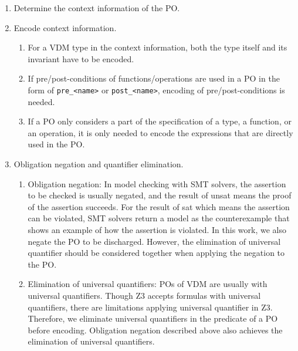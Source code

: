 \begin{enumerate}
\item
Determine the context information of the PO.
\item
Encode context information.
\begin{enumerate}
\item
For a VDM type in the context information, both the type itself and its invariant have to be encoded.
\item
If pre/post-conditions of functions/operations are used in a PO in the form of {\tt pre\_<name>} or {\tt post\_<name>}, encoding of pre/post-conditions is needed.
\item
If a PO only considers a part of the specification of a type, a function, or an operation, it is only needed to encode the expressions that are directly used in the PO.
\end{enumerate}
\item
Obligation negation and quantifier elimination.
\begin{enumerate}
\item
Obligation negation: In model checking with SMT solvers, the assertion to be checked is usually negated, and the result of unsat means the proof of the assertion succeeds. For the result of sat which means the assertion can be violated, SMT solvers return a model as the counterexample that shows an example of how the assertion is violated. In this work, we also negate the PO to be discharged. However, the elimination of universal quantifier should be considered together when applying the negation to the PO.
\item
Elimination of universal quantifiers: POs of VDM are usually with universal quantifiers. Though Z3 accepts formulas with universal quantifiers, there are limitations applying universal quantifier in Z3. Therefore, we eliminate universal quantifiers in the predicate of a PO before encoding. Obligation negation described above also achieves the elimination of universal quantifiers. 

\end{enumerate}
\end{enumerate}
